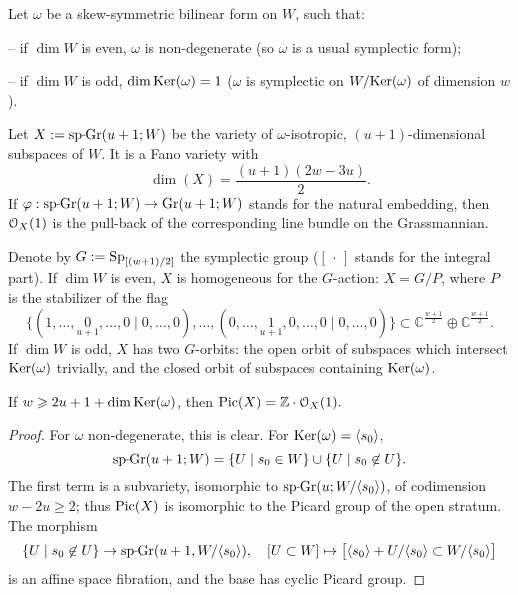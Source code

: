 \documentclass[11pt,reqno]{amsart}
\let\mt\mapsto
\let\euf\EuScript
\let\mbb\mathbb
\let\nit\noindent
\let\vphi\varphi
\let\lan\langle
\let\ran\rangle
\numberwithin{equation}{section}
\numberwithin{figure}{section}
\let\ges\geqslant
\begin{document}
Let $\omega$ be a skew-symmetric bilinear form on $W$, such that: 

-- if $\dim W$ is even, 
$\omega$ is non-degenerate (so $\omega$ is a usual symplectic form); 

-- if $\dim W$ is odd, $\dim{{\rm Ker}}(\omega)=1$ 
($\omega$ is symplectic on $W/{{\rm Ker}}(\omega)$ of dimension $w$). 

\nit Let $X:={{\rm sp{{{\vrule height2.75pt depth-2.35pt width2.3pt \kern1.7pt}}\!}Gr}}(u+1;W)$ be the variety of $\omega$-isotropic, 
$(u+1)$-dimensional subspaces of $W$. It is a Fano variety with 
$$
\dim(X)=\frac{(u+1)(2w-3u)}{2}.
$$ 
If $\vphi:{{\rm sp{{{\vrule height2.75pt depth-2.35pt width2.3pt \kern1.7pt}}\!}Gr}}(u+1;W)\to{{\rm Gr}}(u+1;W)$ stands for the natural embedding, then 
${{\euf O}}_{X}(1)$ is the pull-back of the corresponding line bundle on the Grassmannian. 

Denote by $G:={{\rm Sp}}_{[(w+1)/2]}$ the symplectic group ($[\,\cdot\,]$ stands for 
the integral part). If $\dim W$ is even, $X$ is homogeneous for the $G$-action: 
$X=G/P$, where $P$ is the stabilizer of the flag 
$$
\big\{
(1,\ldots,\underset{u+1}{0},\ldots,0\mid 0,\ldots,0),\ldots,
(0,\ldots,\underset{u+1}{1},0,\ldots,0\mid0,\ldots,0)
\big\}
\subset\mbb C^{\frac{w+1}{2}}\oplus\mbb C^{\frac{w+1}{2}}.
$$
If $\dim W$ is odd, $X$ has two $G$-orbits: the open orbit of subspaces 
which intersect ${{\rm Ker}}(\omega)$ trivially, and the closed orbit of subspaces containing 
${{\rm Ker}}(\omega)$. 
\begin{m-lemma}\label{lm:sp-pic}
If $w\ges 2u+1+\dim{{\rm Ker}}(\omega)$, then ${\mathop{\rm Pic}\nolimits}(X)=\mbb Z\cdot{{\euf O}}_X(1).$
\end{m-lemma}

\begin{proof}
For $\omega$ non-degenerate, this is clear. For ${{\rm Ker}}(\omega)={{\lan {s_0}\ran}}$, 
$$
{{\rm sp{{{\vrule height2.75pt depth-2.35pt width2.3pt \kern1.7pt}}\!}Gr}}(u+1;W)=\{U\mid s_0\in W\}\cup\{U\mid s_0\not\in U\}.
$$
The first term is a subvariety, isomorphic to ${{\rm sp{{{\vrule height2.75pt depth-2.35pt width2.3pt \kern1.7pt}}\!}Gr}}(u;W/{{\lan {s_0}\ran}})$, of codimension 
$w-2u\ges 2$; thus ${\mathop{\rm Pic}\nolimits}(X)$ is isomorphic to the Picard group of the open stratum. 
The morphism 
$$
\{U\mid s_0\not\in U\}\to{{\rm sp{{{\vrule height2.75pt depth-2.35pt width2.3pt \kern1.7pt}}\!}Gr}}(u+1,W/{{\lan {s_0}\ran}}), \quad 
[U\subset W]\mt\big[{{\lan {s_0}\ran}}+U/{{\lan {s_0}\ran}}\subset W/{{\lan {s_0}\ran}}\big]
$$
is an affine space fibration, and the base has cyclic Picard group.
\end{proof}
\end{document}
